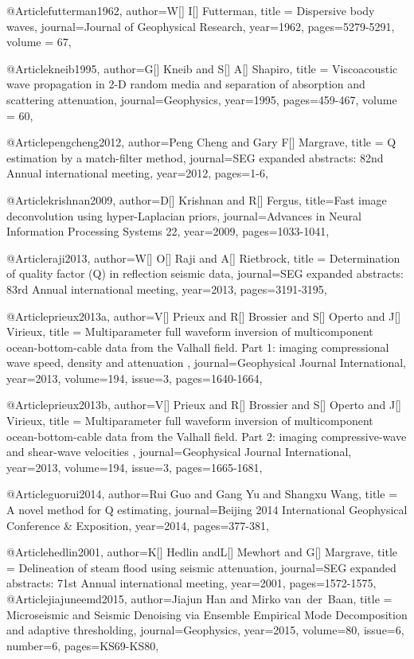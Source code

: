 {@Article{futterman1962,
  author={W[] I[] Futterman},
  title = {Dispersive body waves},
  journal={Journal of Geophysical Research},
  year=1962,
  pages={5279-5291},
  volume = 67,
}

@Article{kneib1995,
  author={G[] Kneib and S[] A[] Shapiro},
  title = {Viscoacoustic wave propagation in 2-D random media and separation of absorption and scattering attenuation},
  journal={Geophysics},
  year=1995,
  pages={459-467},
  volume = 60,
}

@Article{pengcheng2012,
  author={Peng Cheng and Gary F[] Margrave},
  title = {Q estimation by a match-filter method},
  journal={SEG expanded abstracts: 82nd Annual international meeting},
  year=2012,
  pages={1-6},
}

@Article{krishnan2009,
  author={D[] Krishnan and R[] Fergus},
  title={Fast image deconvolution using hyper-Laplacian priors},
  journal={Advances in Neural Information Processing Systems 22},
  year=2009,
  pages={1033-1041},
}

@Article{raji2013,
  author={W[] O[] Raji and A[] Rietbrock},
  title = {Determination of quality factor (Q) in reflection seismic data},
  journal={SEG expanded abstracts: 83rd Annual international meeting},
  year=2013,
  pages={3191-3195},
}

@Article{prieux2013a,
  author={V[] Prieux and R[] Brossier and S[] Operto and J[] Virieux},
  title = {Multiparameter full waveform inversion of multicomponent ocean-bottom-cable data from the Valhall field. {P}art 1: imaging compressional wave speed, density and attenuation },
  journal={Geophysical Journal International},
  year=2013,
  volume=194,
  issue=3,
  pages={1640-1664},
}

@Article{prieux2013b,
  author={V[] Prieux and R[] Brossier and S[] Operto and J[] Virieux},
  title = {Multiparameter full waveform inversion of multicomponent ocean-bottom-cable data from the Valhall field. {P}art 2: imaging compressive-wave and shear-wave velocities },
  journal={Geophysical Journal International},
  year=2013,
  volume=194,
  issue=3,
  pages={1665-1681},
}




@Article{guorui2014,
  author={Rui Guo and Gang Yu and Shangxu Wang},
  title = {A novel method for Q estimating},
  journal={Beijing 2014 International Geophysical Conference \& Exposition},
  year=2014,
  pages={377-381},
}

@Article{hedlin2001,
  author={K[] Hedlin andL[] Mewhort and G[] Margrave},
  title = {Delineation of steam flood using seismic attenuation},
  journal={SEG expanded abstracts: 71st Annual international meeting},
  year=2001,
  pages={1572-1575},
}
@Article{jiajuneemd2015,
  author={Jiajun Han and Mirko van~der~Baan},
  title = {Microseismic and Seismic Denoising via Ensemble Empirical Mode Decomposition and adaptive thresholding},
  journal={Geophysics},
  year=2015,
volume=80,
issue=6,
number=6,
  pages={KS69-KS80},
}

}
